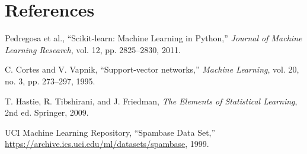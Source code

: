 \documentclass[12pt,a4paper]{article}
\begin{document}
\section{References}
\begin{enumerate}[label={[\arabic*]}]
\item Pedregosa et al., ``Scikit-learn: Machine Learning in Python,'' \textit{Journal of Machine Learning Research}, vol. 12, pp. 2825--2830, 2011.
\item C. Cortes and V. Vapnik, ``Support-vector networks,'' \textit{Machine Learning}, vol. 20, no. 3, pp. 273--297, 1995.
\item T. Hastie, R. Tibshirani, and J. Friedman, \textit{The Elements of Statistical Learning}, 2nd ed. Springer, 2009.
\item UCI Machine Learning Repository, ``Spambase Data Set,'' \url{https://archive.ics.uci.edu/ml/datasets/spambase}, 1999.
\end{enumerate}
\end{document}

